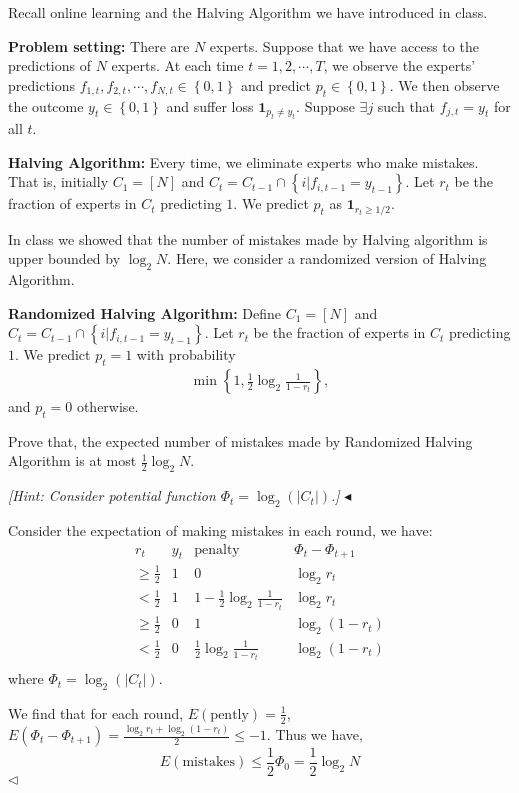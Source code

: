 \documentclass[11pt]{article}
\newenvironment{problem}[2][Problem]{\begin{trivlist}
\item[\hskip \labelsep {\bfseries #1}\hskip \labelsep {\bfseries #2.}]}{\hfill$\blacktriangleleft$\end{trivlist}}
\newenvironment{answer}[1][Answer]{\begin{trivlist}
\item[\hskip \labelsep {\bfseries #1.}\hskip \labelsep]}{\hfill$\lhd$\end{trivlist}}
\begin{document}
\begin{problem}{7 (18')} Recall online learning and the Halving Algorithm we have introduced in class.

\textbf{Problem setting:} There are $N$ experts. Suppose that we have access to the predictions of $N$ experts. At each time $t=1,2,\cdots,T$, we observe the experts' predictions $f_{1,t},f_{2,t},\cdots,f_{N,t}\in\left\{0,1\right\}$ and predict $p_t\in\left\{0,1\right\}$. We then observe the outcome $y_t\in\left\{0,1\right\}$ and suffer loss $\mathbf{1}_{p_t\neq y_t}$. Suppose $\exists j$ such that $f_{j,t}=y_t$ for all $t$.

\textbf{Halving Algorithm:} Every time, we eliminate experts who make mistakes. That is, initially $C_1=[N]$ and $C_t=C_{t-1}\cap\left\{i|f_{i,t-1}=y_{t-1}\right\}$. Let $r_t$ be the fraction of experts in $C_t$ predicting $1$. We predict $p_t$ as $\mathbf{1}_{r_t\geq 1/2}$.

In class we showed that the number of mistakes made by Halving algorithm is upper bounded by $\log_2 N$. Here, we consider a randomized version of Halving Algorithm.

\textbf{Randomized Halving Algorithm:} Define $C_1=[N]$ and $C_t=C_{t-1}\cap\left\{i|f_{i,t-1}=y_{t-1}\right\}$. Let $r_t$ be the fraction of experts in $C_t$ predicting $1$. We predict $p_t=1$ with probability
\begin{align*}
    \min\left\{1,\frac{1}{2}\log_2\frac{1}{1-r_t}\right\},
\end{align*}
and $p_t=0$ otherwise.

Prove that, the expected number of mistakes made by Randomized Halving Algorithm is at most $\frac{1}{2}\log_2 N$.

\textit{[Hint: Consider potential function $\Phi_t=\log_2(|C_t|)$.]}
\end{problem}

\begin{answer}
    Consider the expectation of making mistakes in each round, we have:
$$
\begin{array}{cccc}
r_t & y_t & \text{penalty} & \Phi_t-\Phi_{t+1}\\
\ge \frac{1}{2} & 1 & 0 & \log_2r_t\\
< \frac{1}{2} & 1 & 1-\frac{1}{2}\log_2\frac{1}{1-r_t} & \log_2r_t\\
\ge \frac{1}{2} & 0 & 1 & \log_2 (1-r_t)\\
< \frac{1}{2} & 0 & \frac{1}{2}\log_2\frac{1}{1-r_t} & \log_2 (1-r_t)\\
\end{array}
$$
where $\Phi_t=\log_2(|C_t|)$.

We find that for each round, $E(\text{pently}) = \frac{1}{2}$, $E(\Phi_t-\Phi_{t+1}) = \frac{\log_2r_t+\log_2 (1-r_t)}{2} \leq -1$. Thus we have,
$$E(\text{mistakes}) \leq \frac{1}{2}\Phi_0 = \frac{1}{2}\log_2 N$$
\end{answer}
\end{document}
